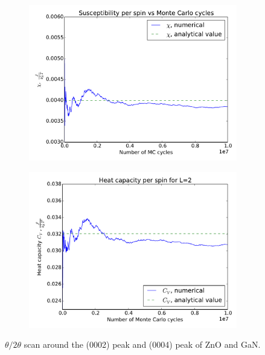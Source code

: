 	
	\begin{figure}[H]
		\begin{subfigure}[b]{0.49\textwidth}
	\includegraphics[width=1\linewidth]{../results/4b/L_2_susceptibility}
\caption{}
\label{fig:l2susceptibility}
		\end{subfigure}
		\hfill
		\begin{subfigure}[b]{0.49\textwidth}
		\includegraphics[width=1\linewidth]{../results/4b/L_2_heat_capasity}
\caption{}
\label{fig:l2heatcapasity}
		\end{subfigure}
		\caption{$\theta/2\theta$ scan around the (0002) peak and (0004) peak of ZnO and GaN.}
	\end{figure}

